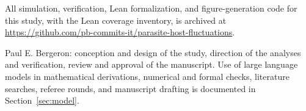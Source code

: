 \documentclass[pdflatex,sn-basic]{sn-jnl}
\theoremstyle{thmstyleone}%
\theoremstyle{thmstyletwo}%
\theoremstyle{thmstylethree}%
\begin{document}
All simulation, verification, Lean formalization, and figure-generation code for this study, with the Lean coverage inventory, is archived at \url{https://github.com/pb-commits-it/parasite-host-fluctuations}.

Paul E. Bergeron: conception and design of the study, direction of the analyses and verification, review and approval of the manuscript. Use of large language models in mathematical derivations, numerical and formal checks, literature searches, referee rounds, and manuscript drafting is documented in Section~\ref{sec:model}.



\begin{appendices}





\end{appendices}
\end{document}

